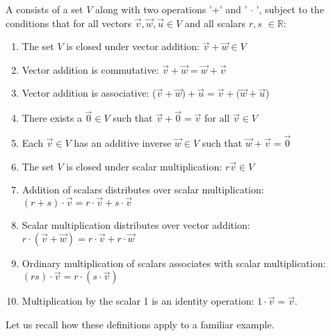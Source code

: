 \begin{defn}
A  consists of a set $V$ along with two operations '+' and  ' $\cdot$ ', subject to the conditions that for all vectors $ \vec {v},\vec{w},\vec{u} \in V$ and all scalars $r, s$ $\in \mathbb{R}$:
\begin {enumerate} [(1)]
\item
The set $V$ is closed under vector addition: \quad  $\vec{v} + \vec{w} \in V$
\item
Vector addition is commutative: \quad  $\vec{v} + \vec{w} = \vec{w} + \vec{v}$
\item
Vector addition is associative: \quad ($\vec{v} + \vec{w}) + \vec{u} = \vec{v} + (\vec{w} + \vec{u}$)
\item
There exists a  $\vec{0} \in V$ such that $\vec{v} + \vec{0} = \vec{v}$ for all $\vec{v} \in V$
\item
Each $\vec{v} \in V$ has an additive inverse $\vec{w} \in V$ such that $\vec{w} + \vec{v} = \vec{0}$
\item
The set $V$ is closed under scalar multiplication: \quad  $ r  \vec{v} \in V$
\item
Addition of scalars distributes over scalar multiplication: \quad $(r+ s) \cdot \vec{v} = r \cdot \vec{v} + s \cdot \vec{v}$
\item
Scalar multiplication distributes over vector addition: \quad $ r \cdot( \vec{v} + \vec{w}) = r \cdot \vec{v} + r \cdot \vec{w}$
\item
Ordinary multiplication of scalars associates with scalar multiplication: \quad $(rs) \cdot \vec{v} = r \cdot (s \cdot \vec{v})$
\item
Multiplication by the scalar 1 is an identity operation: $1 \cdot \vec{v} = \vec{v}$.
\end{enumerate}

\end{defn}
Let us recall how these definitions apply to a familiar example.

